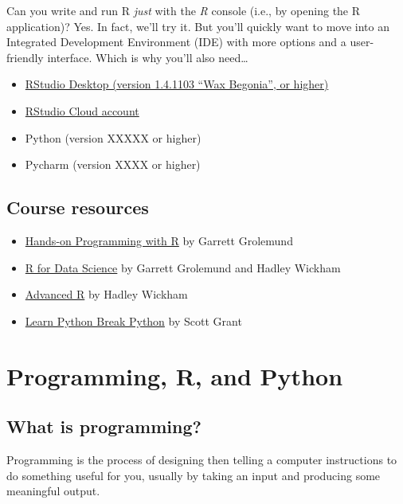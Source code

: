 \documentclass[
]{book}
\providecommand{\tightlist}{%
  \setlength{\itemsep}{0pt}\setlength{\parskip}{0pt}}
\begin{document}
Can you write and run R \emph{just} with the \emph{R} console (i.e., by opening the R application)? Yes. In fact, we'll try it. But you'll quickly want to move into an Integrated Development Environment (IDE) with more options and a user-friendly interface. Which is why you'll also need\ldots{}

\begin{itemize}
\tightlist
\item
  \href{https://rstudio.com/products/rstudio/}{RStudio Desktop (version 1.4.1103 ``Wax Begonia'', or higher)}
\item
  \href{https://rstudio.cloud/}{RStudio Cloud account}
\item
  Python (version XXXXX or higher)
\item
  Pycharm (version XXXX or higher)
\end{itemize}

\hypertarget{course-resources}{%
\section{Course resources}\label{course-resources}}

\begin{itemize}
\item
  \href{https://rstudio-education.github.io/hopr/}{Hands-on Programming with R} by Garrett Grolemund
\item
  \href{https://r4ds.had.co.nz/}{R for Data Science} by Garrett Grolemund and Hadley Wickham
\item
  \href{https://adv-r.hadley.nz/}{Advanced R} by Hadley Wickham
\item
  \href{https://learnpythonbreakpython.com/}{Learn Python Break Python} by Scott Grant
\end{itemize}

\hypertarget{r-py}{%
\chapter{Programming, R, and Python}\label{r-py}}

\hypertarget{what-is-programming}{%
\section{What is programming?}\label{what-is-programming}}

Programming is the process of designing then telling a computer instructions to do something useful for you, usually by taking an input and producing some meaningful output.
\end{document}

